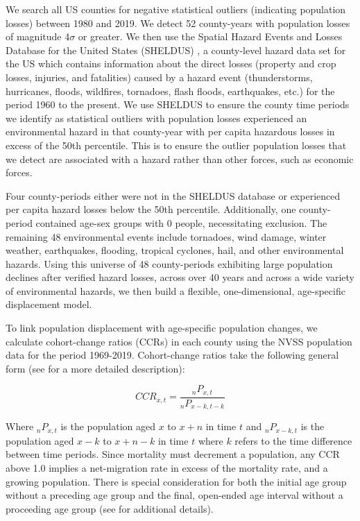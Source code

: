 \documentclass[12pt]{article}
\begin{document}
We search all US counties for negative statistical outliers (indicating
population losses) between 1980 and 2019. We detect 52 county-years with
population losses of magnitude 4\(\sigma\) or greater. We then use the
Spatial Hazard Events and Losses Database for the United States
(SHELDUS) \citep{SHELDUS}, a county-level hazard data set for the US
which contains information about the direct losses (property and crop
losses, injuries, and fatalities) caused by a hazard event
(thunderstorms, hurricanes, floods, wildfires, tornadoes, flash floods,
earthquakes, etc.) for the period 1960 to the present. We use SHELDUS to
ensure the county time periods we identify as statistical outliers with
population losses experienced an environmental hazard in that
county-year with per capita hazardous losses in excess of the 50th
percentile. This is to ensure the outlier population losses that we
detect are associated with a hazard rather than other forces, such as
economic forces.

Four county-periods either were not in the SHELDUS database or
experienced per capita hazard losses below the 50th percentile.
Additionally, one county-period contained age-sex groups with 0 people,
necessitating exclusion. The remaining 48 environmental events include
tornadoes, wind damage, winter weather, earthquakes, flooding, tropical
cyclones, hail, and other environmental hazards. Using this universe of
48 county-periods exhibiting large population declines after verified
hazard losses, across over 40 years and across a wide variety of
environmental hazards, we then build a flexible, one-dimensional,
age-specific displacement model.

To link population displacement with age-specific population changes, we
calculate cohort-change ratios (CCRs) in each county using the NVSS
population data for the period 1969-2019. Cohort-change ratios take the
following general form (see
\citep[\citet{swanson2010forecasting}]{hauer2019population} for a more
detailed description):

\[CCR_{x,t}  =  \frac{_nP_{x,t}} {_nP_{x-k,t-k}} \tag{2}\]

Where \(_nP_{x,t}\) is the population aged \(x\) to \(x+n\) in time
\(t\) and \(_nP_{x-k,t}\) is the population aged \(x-k\) to \(x+n-k\) in
time \(t\) where \(k\) refers to the time difference between time
periods. Since mortality must decrement a population, any CCR above 1.0
implies a net-migration rate in excess of the mortality rate, and a
growing population. There is special consideration for both the initial
age group without a preceding age group and the final, open-ended age
interval without a proceeding age group (see \citep{hauer2019population}
for additional details).
\end{document}
